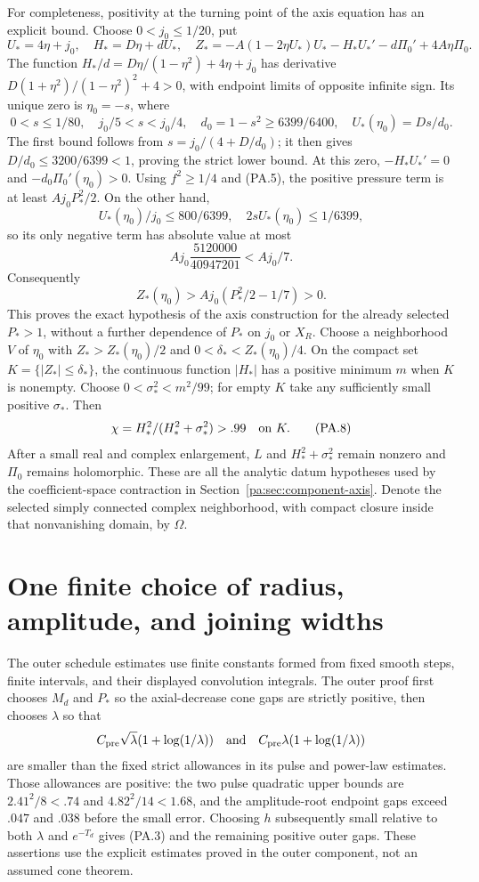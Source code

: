 \documentclass[10pt,a4paper]{article}
\newcounter{none}
\begin{document}
For completeness, positivity at the turning point of the axis equation has an
explicit bound. Choose $0<j_0\le1/20$, put
\[
 U_*=4\eta+j_0,\quad H_*=D\eta+dU_*,\quad
 Z_*=-A(1-2\eta U_*)U_*-H_*U_*'-d\Pi_0'+4A\eta\Pi_0.
\]
The function $H_*/d=D\eta/(1-\eta^2)+4\eta+j_0$ has derivative
$D(1+\eta^2)/(1-\eta^2)^2+4>0$, with endpoint limits of opposite
infinite sign. Its unique zero is $\eta_0=-s$, where
\[
 0<s\le1/80,\quad j_0/5<s<j_0/4,\quad
 d_0=1-s^2\ge6399/6400,\quad U_*(\eta_0)=Ds/d_0.
\]
The first bound follows from $s=j_0/(4+D/d_0)$; it then gives
$D/d_0\le3200/6399<1$, proving the strict lower bound.
At this zero, $-H_*U_*'=0$ and $-d_0\Pi_0'(\eta_0)>0$.
Using $f^2\ge1/4$ and (PA.5), the positive pressure term is at least
$A j_0P_*^2/2$. On the other hand,
\[
 U_*(\eta_0)/j_0\le800/6399,\quad
 2sU_*(\eta_0)\le1/6399,
\]
so its only negative term has absolute value at most
\[
 A j_0\frac{5120000}{40947201}<A j_0/7.
\]
Consequently
\[
 Z_*(\eta_0)>A j_0(P_*^2/2-1/7)>0.                              \tag{PA.7}
\]
This proves the exact hypothesis of the axis construction for the already selected
$P_*>1$, without a further dependence of $P_*$ on $j_0$ or $X_R$.
Choose a neighborhood $V$ of $\eta_0$ with $Z_*>Z_*(\eta_0)/2$ and
$0<\delta_*<Z_*(\eta_0)/4$. On the compact set
$K=\{|Z_*|\le\delta_*\}$, the continuous function $|H_*|$ has a
positive minimum $m$ when $K$ is nonempty. Choose
$0<\sigma_*^2<m^2/99$; for empty $K$ take any sufficiently small positive
$\sigma_*$. Then
\[
 \chi=H_*^2/(H_*^2+\sigma_*^2)>.99\quad\hbox{on }K.              \tag{PA.8}
\]
After a small real and complex enlargement, $L$ and $H_*^2+\sigma_*^2$
remain nonzero and $\Pi_0$ remains holomorphic. These are all the analytic
datum hypotheses used by the coefficient-space contraction in
Section~\ref{pa:sec:component-axis}.
Denote the selected simply connected complex neighborhood, with compact closure
inside that nonvanishing domain, by $\Omega$.

\section{One finite choice of radius, amplitude, and joining widths}\label{pa:sec:assembly-parameters}
The outer schedule estimates use finite constants formed from fixed smooth steps,
finite intervals, and their displayed convolution integrals. The outer proof first
chooses $M_d$ and $P_*$ so the axial-decrease cone gaps are strictly positive,
then chooses $\lambda$ so that
\[
 C_{\rm pre}\sqrt\lambda(1+\log(1/\lambda))
 \quad\hbox{and}\quad C_{\rm pre}\lambda(1+\log(1/\lambda))
\]
are smaller than the fixed strict allowances in its pulse and power-law estimates.
Those allowances are positive: the two pulse quadratic upper bounds are
$2.41^2/8<.74$ and $4.82^2/14<1.68$, and the amplitude-root endpoint
gaps exceed $.047$ and $.038$ before the small error. Choosing $h$ subsequently
small relative to both $\lambda$ and $e^{-T_d}$ gives (PA.3) and the remaining
positive outer gaps. These assertions use the explicit estimates proved in the
outer component, not an assumed cone theorem.
\end{document}
